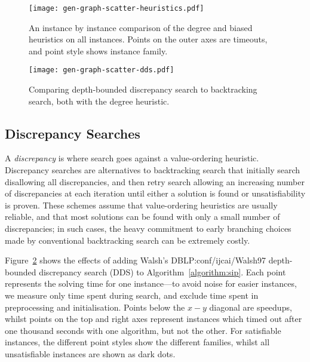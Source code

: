\documentclass[a4paper,UKenglish]{lipics-v2018}
\newcommand{\Figureref}[1]{Figure~\ref{#1}}
\newcommand{\algorithmref}[1]{Algorithm~\ref{#1}}
\begin{document}
\begin{figure}[p]
    \centering
    \texttt{[image: gen-graph-scatter-heuristics.pdf]}

    \caption{An instance by instance comparison of the degree and biased heuristics on all
    instances. Points on the outer axes are timeouts, and point style shows instance family.}
    \label{figure:scatter-heuristics}
\end{figure}

\begin{figure}[p]
    \centering
    \texttt{[image: gen-graph-scatter-dds.pdf]}

    \caption{Comparing depth-bounded discrepancy search to backtracking search, both with the degree
    heuristic.}\label{figure:scatter-dds}
\end{figure}

\subsection{Discrepancy Searches}

A \emph{discrepancy} is where search goes against a value-ordering heuristic.  Discrepancy searches
\cite{DBLP:conf/ijcai/HarveyG95,DBLP:conf/aaai/Korf96,DBLP:conf/ijcai/Walsh97} are alternatives to
backtracking search that initially search disallowing all discrepancies, and then retry search
allowing an increasing number of discrepancies at each iteration until either a solution is found or
unsatisfiability is proven. These schemes assume that value-ordering heuristics are usually
reliable, and that most solutions can be found with only a small number of discrepancies; in such
cases, the heavy commitment to early branching choices made by conventional backtracking search can
be extremely costly.

\Figureref{figure:scatter-dds} shows the effects of adding Walsh's {DBLP:conf/ijcai/Walsh97}
depth-bounded discrepancy search (DDS) to \algorithmref{algorithm:sip}. Each point represents the solving
time for one instance---to avoid noise for easier instances, we measure only time spent during
search, and exclude time spent in preprocessing and initialisation.  Points below the $x-y$ diagonal
are speedups, whilst points on the top and right axes represent instances which timed out after one
thousand seconds with one algorithm, but not the other. For satisfiable instances, the different
point styles show the different families, whilst all unsatisfiable instances are shown as dark dots.
\end{document}
